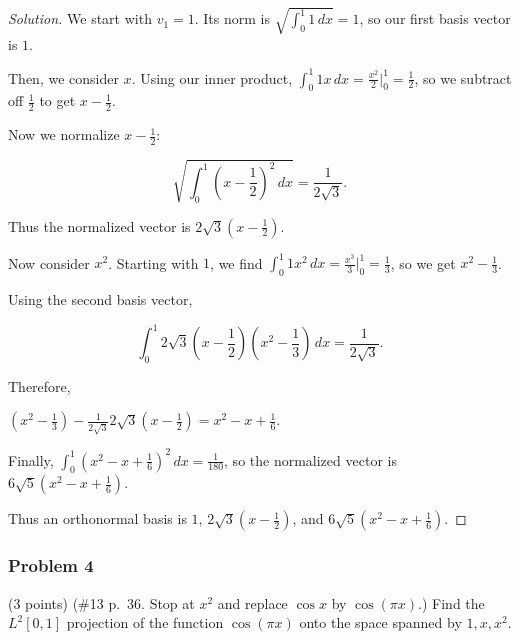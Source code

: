 \documentclass[11pt]{article}
\newcommand{\1}{\mathbf{1}}
\theoremstyle{definition}
\newenvironment{solution}{\begin{proof}[Solution]}{\end{proof}}
\begin{document}
\begin{solution}
We start with $v_1=1$. Its norm is $\sqrt{\int_0^1 1\,dx}=1$, so our first basis vector is $1$.

\par Then, we consider $x$. Using our inner product, $\int_0^1 1x\,dx=\frac{x^2}{2}\big|_0^1=\frac12$, so we subtract off $\frac12$ to get $x-\frac12$.

\par Now we normalize $x-\frac12$:

\[
\sqrt{\int_0^1\left(x-\frac12\right)^2\,dx}
=\frac{1}{2\sqrt3}.
\]

Thus the normalized vector is $2\sqrt3\left(x-\frac12\right)$.

\par Now consider $x^2$. Starting with $1$, we find $\int_0^1 1x^2\,dx=\frac{x^3}{3}\big|_0^1=\frac13$, so we get $x^2-\frac13$.

\par Using the second basis vector,

\[
\int_0^1
2\sqrt3\left(x-\frac12\right)
\left(x^2-\frac13\right)\,dx
=\frac{1}{2\sqrt3}.
\]

Therefore,

$\left(x^2-\frac13\right)-\frac{1}{2\sqrt3}2\sqrt3\left(x-\frac12\right)=x^2-x+\frac16$.

\par Finally, $\int_0^1\left(x^2-x+\frac16\right)^2\,dx=\frac{1}{180}$, so the normalized vector is $6\sqrt5\left(x^2-x+\frac16\right)$.

Thus an orthonormal basis is $1$, $2\sqrt3\left(x-\frac12\right)$, and $6\sqrt5\left(x^2-x+\frac16\right)$.
\end{solution}

\subsubsection*{Problem 4}
(3 points) (\#13 p.~36. Stop at $x^2$ and replace $\cos x$ by $\cos(\pi x)$.) Find the $L^2[0,1]$ projection of the function $\cos(\pi x)$ onto the space spanned by $1,x,x^2$.
\end{document}
